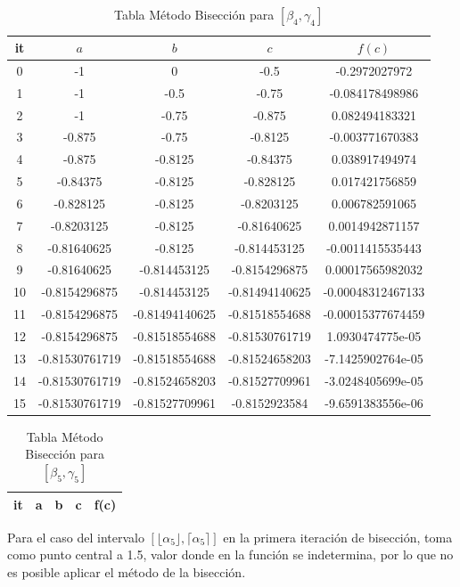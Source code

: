\documentclass{article} %
\begin{document}
\begin{table}[H]
\centering
\begin{tabular}{|c|c|c|c|c|}
\hline
it & $a$ & $b$ & $c$ & $f(c)$\\
\hline
0 & -1 & 0 & -0.5 & -0.2972027972\\
1 & -1 & -0.5 & -0.75 & -0.084178498986\\
2 & -1 & -0.75 & -0.875 & 0.082494183321\\
3 & -0.875 & -0.75 & -0.8125 & -0.003771670383\\
4 & -0.875 & -0.8125 & -0.84375 & 0.038917494974\\
5 & -0.84375 & -0.8125 & -0.828125 & 0.017421756859\\
6 & -0.828125 & -0.8125 & -0.8203125 & 0.006782591065\\
7 & -0.8203125 & -0.8125 & -0.81640625 & 0.0014942871157\\
8 & -0.81640625 & -0.8125 & -0.814453125 & -0.0011415535443\\
9 & -0.81640625 & -0.814453125 & -0.8154296875 & 0.00017565982032\\
10 & -0.8154296875 & -0.814453125 & -0.81494140625 & -0.00048312467133\\
11 & -0.8154296875 & -0.81494140625 & -0.81518554688 & -0.00015377674459\\
12 & -0.8154296875 & -0.81518554688 & -0.81530761719 & 1.0930474775e-05\\
13 & -0.81530761719 & -0.81518554688 & -0.81524658203 & -7.1425902764e-05\\
14 & -0.81530761719 & -0.81524658203 & -0.81527709961 & -3.0248405699e-05\\
15 & -0.81530761719 & -0.81527709961 & -0.8152923584 & -9.6591383556e-06\\
\hline
\end{tabular}
\caption{Tabla Método Bisección para $[\beta_4,\gamma_4]$}
\end{table}

\begin{table}[H]
\centering
    \begin{tabular}{|c|c|c|c|c|}
    \hline
it & a & b & c & f(c) \\ 
\hline
\end{tabular}
\caption{Tabla Método Bisección para $[\beta_5,\gamma_5]$}
\end{table}

Para el caso del intervalo $[\lfloor \alpha_5 \rfloor,\lceil \alpha_5 \rceil]$ en la primera iteración de bisección, toma como punto central a 1.5, valor donde en la función se indetermina, por lo que no es posible aplicar el método de la bisección.
\end{document}
